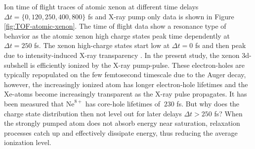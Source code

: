 Ion time of flight traces of atomic xenon at different time delays $\Delta t = \{0, 120, 250, 400, 800\}$ fs and X-ray pump only data is shown in Figure \ref{fig:TOF-atomic-xenon}. The time of flight data show a resonance type of behavior as the atomic xenon high charge states peak time dependently at $\Delta t = 250$ fs. The xenon high-charge states start low at $\Delta t = 0$ fs and then peak due to intensity-induced X-ray transparency \citep{Young-2010-Nature,Schorb-2012-PRL}. In the present study, the xenon 3d-subshell is efficiently ionized by the X-ray pump-pulse. These electron-holes are typically repopulated on the few femtosecond timescale due to the Auger decay, however, the increasingly ionized atom has longer electron-hole lifetimes and the Xe-atoms become increasingly transparent as the X-ray pulse propagates. It has been measured that $\text{Ne}^{8+}$ has core-hole lifetimes of $~230$ fs. But why does the charge state distribution then not level out for later delays $\Delta t > 250$ fs? When the strongly pumped atom does not absorb energy near saturation, relaxation processes catch up and effectively dissipate energy, thus reducing the average ionization level.\\

